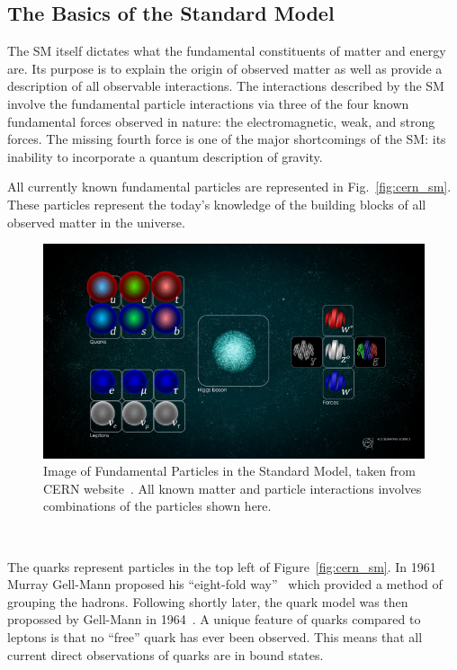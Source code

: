 \subsection{The Basics of the Standard Model}

The SM itself dictates what the fundamental constituents of matter and energy are.
Its purpose is to explain the origin of observed matter as well as provide a description of all observable interactions.
The interactions described by the SM involve the fundamental particle interactions via three of the four known fundamental forces observed in nature: the electromagnetic, weak, and strong forces.
The missing fourth force is one of the major shortcomings of the SM: its inability to incorporate a quantum description of gravity.

All currently known fundamental particles are represented in Fig.~\ref{fig:cern_sm}.
These particles represent the today's knowledge of the building blocks of all observed matter in the universe.

\begin{figure}[]
\centering
\includegraphics[width=\textwidth]{images/STDM_higgs_and_field_D.png}
\caption{Image of Fundamental Particles in the Standard Model, taken from CERN website~\citep{dominguez_2015}.
  All known matter and particle interactions involves combinations of the particles shown here.}
\end{figure}
~\label{fig:cern_sm}

The quarks represent particles in the top left of Figure~\ref{fig:cern_sm}.
In 1961 Murray Gell-Mann proposed his ``eight-fold way''~\citep{eightfold_way_osti_4008239} which provided a method of grouping the hadrons.
Following shortly later, the quark model was then propossed by Gell-Mann in 1964~\citep{quark_model_GELLMANN1964214}.
A unique feature of quarks compared to leptons is that no ``free'' quark has ever been observed.
This means that all current direct observations of quarks are in bound states.

